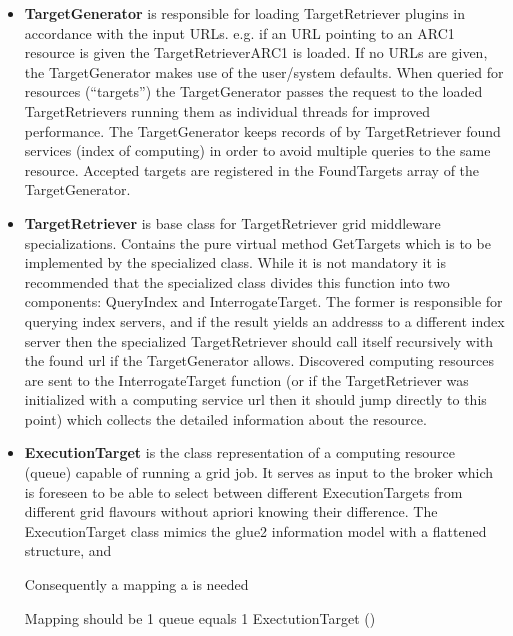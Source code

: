 \documentclass{book}
\begin{document}
\begin{itemize}

\item{{\bf TargetGenerator} is responsible for loading TargetRetriever plugins in accordance with the input URLs. 
e.g. if an URL pointing to an ARC1 resource is given the TargetRetrieverARC1 is loaded. If no URLs are given, the 
TargetGenerator makes use of the user/system defaults. When queried for resources (``targets'') the TargetGenerator 
passes the request to the loaded TargetRetrievers running them as individual threads for improved performance. The 
TargetGenerator keeps records of by TargetRetriever found services (index of computing) in order to avoid multiple 
queries to the same resource. Accepted targets are registered in the FoundTargets array of the TargetGenerator.}

\item{{\bf TargetRetriever} is base class for TargetRetriever grid middleware specializations. Contains the pure 
virtual method GetTargets which is to be implemented by the specialized class. While it is not mandatory it is recommended 
that the specialized class divides this function into two components: QueryIndex and InterrogateTarget. The former is 
responsible for querying index servers, and if the result yields an addresss to a different index server then the 
specialized TargetRetriever should call itself recursively with the found url if the TargetGenerator allows. Discovered 
computing resources are sent to the InterrogateTarget function (or if the TargetRetriever was initialized with a computing 
service url then it should jump directly to this point) which collects the detailed information about the resource.}

\item{{\bf ExecutionTarget} is the class representation of a computing resource (queue) capable of running a grid job. It
serves as input to the broker which is foreseen to be able to select between different ExecutionTargets from different 
grid flavours without apriori knowing their difference. The ExecutionTarget class mimics the glue2 information model with 
a flattened structure, and 

Consequently a mapping a is needed
 
Mapping should be 1 queue equals 1 ExectutionTarget ()}

\end{itemize}

\end{document}
